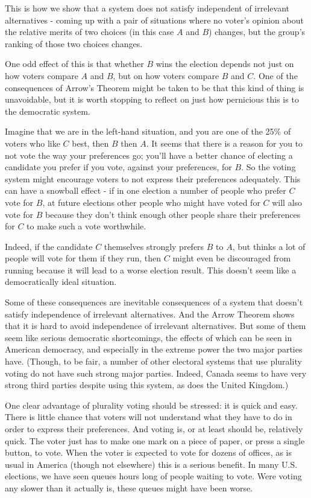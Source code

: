 \documentclass[openany]{book}
\begin{document}
This is how we show that a system does not satisfy independent of irrelevant alternatives - coming up with a pair of situations where no voter's opinion about the relative merits of two choices (in this case $A$ and $B$) changes, but the group's ranking of those two choices changes.

One odd effect of this is that whether $B$ wins the election depends not just on how voters compare $A$ and $B$, but on how voters compare $B$ and $C$. One of the consequences of Arrow's Theorem might be taken to be that this kind of thing is unavoidable, but it is worth stopping to reflect on just how pernicious this is to the democratic system. 

Imagine that we are in the left-hand situation, and you are one of the 25\% of voters who like $C$ best, then $B$ then $A$. It seems that there is a reason for you to not vote the way your preferences go; you'll have a better chance of electing a candidate you prefer if you vote, against your preferences, for $B$. So the voting system might encourage voters to not express their preferences adequately. This can have a snowball effect - if in one election a number of people who prefer $C$ vote for $B$, at future elections other people who might have voted for $C$ will also vote for $B$ because they don't think enough other people share their preferences for $C$ to make such a vote worthwhile.

Indeed, if the candidate $C$ themselves strongly prefers $B$ to $A$, but thinks a lot of people will vote for them if they run, then $C$ might even be discouraged from running because it will lead to a worse election result. This doesn't seem like a democratically ideal situation.

Some of these consequences are inevitable consequences of a system that doesn't satisfy independence of irrelevant alternatives. And the Arrow Theorem shows that it is hard to avoid independence of irrelevant alternatives. But some of them seem like serious democratic shortcomings, the effects of which can be seen in American democracy, and especially in the extreme power the two major parties have. (Though, to be fair, a number of other electoral systems that use plurality voting do not have such strong major parties. Indeed, Canada seems to have very strong third parties despite using this system, as does the United Kingdom.)

One clear advantage of plurality voting should be stressed: it is quick and easy. There is little chance that voters will not understand what they have to do in order to express their preferences. And voting is, or at least should be, relatively quick. The voter just has to make one mark on a piece of paper, or press a single button, to vote. When the voter is expected to vote for dozens of offices, as is usual in America (though not elsewhere) this is a serious benefit. In many U.S. elections, we have seen queues hours long of people waiting to vote. Were voting any slower than it actually is, these queues might have been worse.
\end{document}
